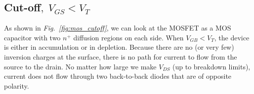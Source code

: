 \subsection{Cut-off\texorpdfstring{$,\;V_{GS}<V_T$}{}}
As shown in \emph{Fig.~\ref{fig:mos_cutoff}}, we can look at the MOSFET as a MOS capacitor with two $n^+$ diffusion regions on each side. When $V_{GB} < V_T$, the device is either in accumulation or in depletion.  Because there are no (or very few) inversion charges at the surface, there is no path for current to flow from the source to the drain.  No matter how large we make $V_{DS}$ (up to breakdown limits), current does not flow through two back-to-back diodes that are of opposite polarity.
